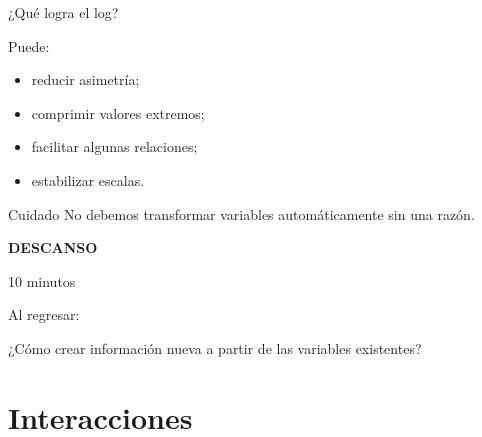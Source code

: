 \documentclass[aspectratio=169,11pt]{beamer}
\begin{document}

\begin{frame}{¿Qué logra el log?}

Puede:

\begin{itemize}

    \item reducir asimetría;

    \item comprimir valores extremos;

    \item facilitar algunas relaciones;

    \item estabilizar escalas.

\end{itemize}

\vspace{0.4cm}

\begin{alertblock}{Cuidado}
No debemos transformar variables automáticamente sin una razón.
\end{alertblock}

\end{frame}


\begin{frame}

\begin{center}

{\Huge
\textcolor{azulmarista}{
\textbf{DESCANSO}
}
}

\vspace{0.6cm}

{\Large
10 minutos
}

\vspace{1cm}

{\Large
Al regresar:
}

\vspace{0.4cm}

{\LARGE
¿Cómo crear información nueva a partir
de las variables existentes?
}

\end{center}

\end{frame}

\section{Interacciones}
\end{document}
